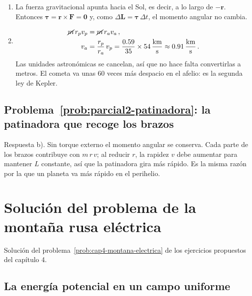 \documentclass[11pt,a4paper]{book}
\begin{document}
\begin{enumerate}[label=\alph*)]
    \item La fuerza gravitacional apunta hacia el Sol, es decir, a lo largo de
    $-\boldsymbol{r}$. Entonces
    $\boldsymbol{\tau} = \boldsymbol{r}\times\boldsymbol{F} = \boldsymbol{0}$
    y, como $\Delta\boldsymbol{L} = \boldsymbol{\tau}\,\Delta t$, el momento
    angular no cambia.
    \item
    \begin{align}
        \cancel{m}\, r_p v_p &= \cancel{m}\, r_a v_a\,, \nonumber\\
        v_a &= \frac{r_p}{r_a}\,v_p
             = \frac{0.59}{35} \times \SI{54}{\kilo\meter\per\second}
             \approx \SI{0.91}{\kilo\meter\per\second}\,.
    \end{align}
    Las unidades astronómicas se cancelan, así que no hace falta convertirlas
    a metros. El cometa va unas 60 veces más despacio en el afelio: es la
    segunda ley de Kepler.
\end{enumerate}

\subsection*{Problema~\ref{prob:parcial2-patinadora}: la patinadora que recoge los brazos}
\label{sol:parcial2-patinadora}

Respuesta b). Sin torque externo el momento angular se conserva. Cada parte
de los brazos contribuye con $m\,r\,v$; al reducir $r$, la rapidez $v$ debe
aumentar para mantener $L$ constante, así que la patinadora gira más rápido.
Es la misma razón por la que un planeta va más rápido en el perihelio.

\section{Solución del problema de la montaña rusa eléctrica}
\label{sol:cap4-montana-electrica}

Solución del problema~\ref{prob:cap4-montana-electrica} de los ejercicios propuestos del capítulo 4.

\subsection*{La energía potencial en un campo uniforme}
\end{document}
